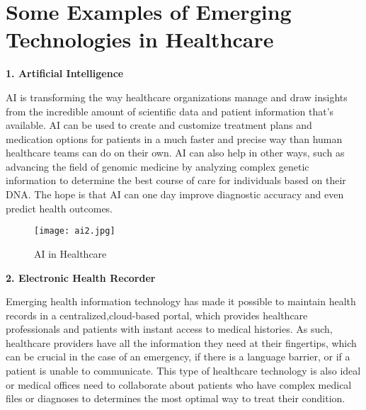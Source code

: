 \documentclass[12pt,a4paper]{article}
\begin{document}
\clearpage

\section{Some Examples of Emerging Technologies in Healthcare} 

\hspace{1cm}

\textbf{1. Artificial Intelligence}

\hspace{1cm}

AI is transforming the way healthcare organizations manage and draw insights from the incredible amount of scientific data and patient information that's available. AI can be used to create and customize treatment plans and medication options for patients in a much faster and precise way than human healthcare teams can do on their own. AI can also help in other ways, such as advancing the field of genomic medicine by analyzing complex genetic information to determine the best course of care for individuals based on their DNA. The hope is that AI can one day improve diagnostic accuracy and even predict health outcomes.

\hspace{5cm}

\begin{figure}[h]
\centering
\texttt{[image: ai2.jpg]}
\caption{AI in Healthcare}
\end{figure}


\clearpage

\textbf{2. Electronic Health Recorder}

\hspace{1cm}

Emerging health information technology has made it possible to maintain health records in a centralized,cloud-based portal, which provides healthcare professionals and patients with instant access to medical histories. As such, healthcare providers have all the information they need at their fingertips, which can be crucial in the case of an emergency, if there is a language barrier, or if a patient is unable to communicate. This type of healthcare technology is also ideal or medical offices need to collaborate about patients who have complex medical files or diagnoses to determines the most optimal way to treat their condition.

\hspace{5cm}
\end{document}
